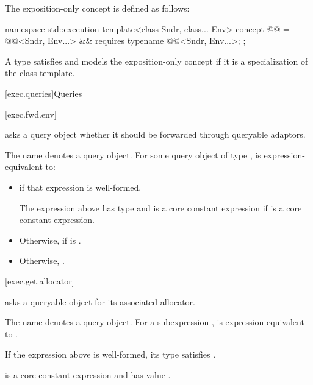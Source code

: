 \pnum
The exposition-only concept  is defined as follows:
\begin{codeblock}
namespace std::execution {
  template<class Sndr, class... Env>
    concept @@ = @@<Sndr, Env...> &&
      requires {
        typename @@<Sndr, Env...>;
      };
}
\end{codeblock}

\pnum
A type satisfies and models the exposition-only concept
 if
it is a specialization of the  class template.

[exec.queries]{Queries}

[exec.fwd.env]{}

\pnum
{} asks a query object
whether it should be forwarded through queryable adaptors.

\pnum
The name  denotes a query object.
For some query object  of type ,
 is expression-equivalent to:
\begin{itemize}
\item
{}
if that expression is well-formed.

\mandates
The expression above has type  and
is a core constant expression if  is a core constant expression.
\item
Otherwise,  if  is .
\item
Otherwise, .
\end{itemize}

[exec.get.allocator]{}

\pnum
{} asks a queryable object for its associated allocator.

\pnum
The name  denotes a query object.
For a subexpression ,
 is expression-equivalent to
.

\mandates
If the expression above is well-formed,
its type satisfies
.

\pnum
{} is a core constant expression and
has value .

